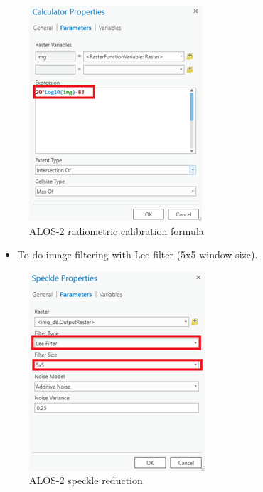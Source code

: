 \documentclass[]{book}
\providecommand{\tightlist}{%
  \setlength{\itemsep}{0pt}\setlength{\parskip}{0pt}}
\theoremstyle{definition}
\theoremstyle{definition}
\theoremstyle{definition}
\theoremstyle{remark}
\begin{document}
\begin{figure}

{\centering \includegraphics[width=0.7\linewidth]{img/fig41_workflow2} 

}

\caption{ALOS-2 radiometric calibration formula}\label{fig:fig42c}
\end{figure}

\begin{itemize}
\tightlist
\item
  To do image filtering with Lee filter (5x5 window size).
\end{itemize}

\begin{figure}

{\centering \includegraphics[width=0.7\linewidth]{img/fig42_workflow3} 

}

\caption{ALOS-2 speckle reduction}\label{fig:fig42d}
\end{figure}
\end{document}
